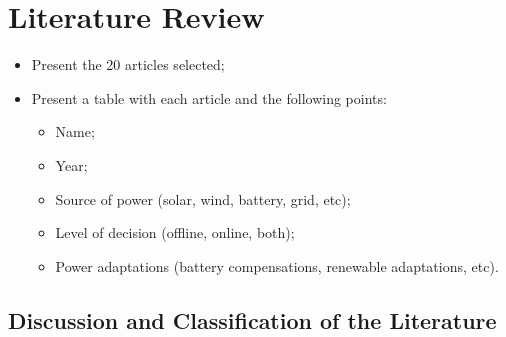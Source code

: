 \section{Literature Review}

\begin{itemize}
    \item Present the 20 articles selected;
    \item Present a table with each article and the following points:
    \begin{itemize}
        \item Name;
        \item Year;
        \item Source of power (solar, wind, battery, grid, etc);
        \item Level of decision (offline, online, both);
        \item Power adaptations (battery compensations, renewable adaptations, etc).
    \end{itemize}
\end{itemize}

\subsection{Discussion and Classification of the Literature}